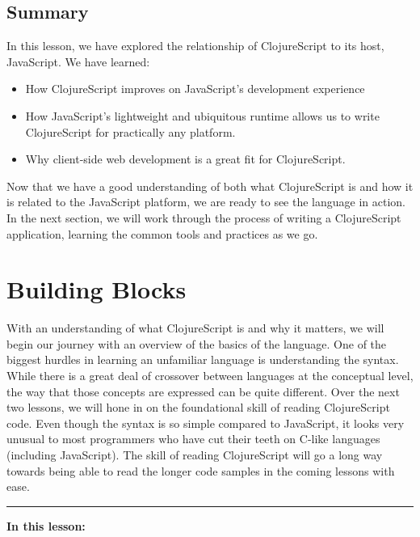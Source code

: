 \documentclass[10pt,twoside,openright]{memoir}
\begin{document}
\section{Summary}

In this lesson, we have explored the relationship of ClojureScript to
its host, JavaScript. We have learned:

\begin{itemize}
\tightlist
\item
  How ClojureScript improves on JavaScript's development experience
\item
  How JavaScript's lightweight and ubiquitous runtime allows us to write
  ClojureScript for practically any platform.
\item
  Why client-side web development is a great fit for ClojureScript.
\end{itemize}

Now that we have a good understanding of both what ClojureScript is and
how it is related to the JavaScript platform, we are ready to see the
language in action. In the next section, we will work through the
process of writing a ClojureScript application, learning the common
tools and practices as we go.


\chapter{Building Blocks}

With an understanding of what ClojureScript is and why it matters, we
will begin our journey with an overview of the basics of the language.
One of the biggest hurdles in learning an unfamiliar language is
understanding the syntax. While there is a great deal of crossover
between languages at the conceptual level, the way that those concepts
are expressed can be quite different. Over the next two lessons, we will
hone in on the foundational skill of reading ClojureScript code. Even
though the syntax is so simple compared to JavaScript, it looks very
unusual to most programmers who have cut their teeth on C-like languages
(including JavaScript). The skill of reading ClojureScript will go a
long way towards being able to read the longer code samples in the
coming lessons with ease.

\begin{center}\rule{0.5\linewidth}{0.5pt}\end{center}

\textbf{In this lesson:}
\end{document}

